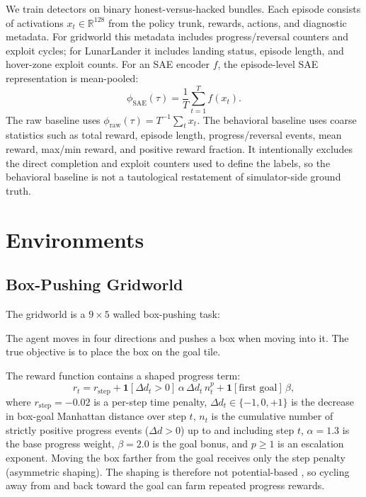\documentclass[11pt]{article}
\begin{document}
We train detectors on binary honest-versus-hacked bundles. Each episode
consists of activations $x_t \in \mathbb{R}^{128}$ from the policy trunk,
rewards, actions, and diagnostic metadata. For gridworld this metadata
includes progress/reversal counters and exploit cycles; for LunarLander it
includes landing status, episode length, and hover-zone exploit counts.
For an SAE encoder $f$, the episode-level SAE representation is mean-pooled:
\begin{equation}
  \phi_{\text{SAE}}(\tau) = \frac{1}{T}\sum_{t=1}^{T} f(x_t).
\end{equation}
The raw baseline uses $\phi_{\text{raw}}(\tau)=T^{-1}\sum_t x_t$.
The behavioral baseline uses coarse statistics such as total reward,
episode length, progress/reversal events, mean reward, max/min reward, and
positive reward fraction. It intentionally excludes the direct completion and
exploit counters used to define the labels, so the behavioral baseline is not
a tautological restatement of simulator-side ground truth.

\section{Environments}

\subsection{Box-Pushing Gridworld}

The gridworld is a $9 \times 5$ walled box-pushing task:
\begin{center}
\setlength{\fboxsep}{6pt}
\end{center}
The agent moves in four directions and pushes a box when moving into it. The true objective is to place the box on the goal tile.

The reward function contains a shaped progress term:
\begin{equation}
  r_t = r_{\text{step}} +
  \mathbf{1}[\Delta d_t > 0]\,\alpha\, \Delta d_t\, n_t^p +
  \mathbf{1}[\text{first goal}]\, \beta,
\end{equation}
where $r_{\text{step}}=-0.02$ is a per-step time penalty, $\Delta d_t \in \{-1,0,+1\}$ is the decrease in box-goal Manhattan distance over step $t$, $n_t$ is the cumulative number of strictly positive progress events ($\Delta d > 0$) up to and including step $t$, $\alpha=1.3$ is the base progress weight, $\beta=2.0$ is the goal bonus, and $p\geq 1$ is an escalation exponent. Moving the box farther from the goal receives only the step penalty (asymmetric shaping). The shaping is therefore not potential-based \cite{ng1999shaping}, so cycling away from and back toward the goal can farm repeated progress rewards.
\end{document}
